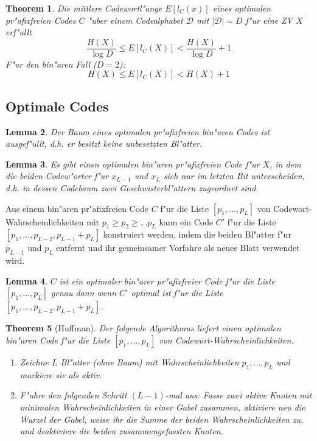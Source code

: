 \documentclass[german, 10pt, a4paper, twocolumn]{scrartcl}
\newtheorem{theorem}{Theorem}
\newtheorem{lemma}[theorem]{Lemma}
\begin{document}
\begin{theorem}
	Die mittlere Codewortl"ange $E[l_C(x)]$ eines optimalen pr"afixfreien Codes $C$ "uber einem Codealphabet $\mathcal{D}$ mit $|\mathcal{D}|=D$ f"ur eine ZV $X$ erf"ullt
	\begin{displaymath}
		\frac{H(X)}{\log D} \leq E[l_C(X)] < \frac{H(X)}{\log D} + 1
	\end{displaymath}
	F"ur den bin"aren Fall ($D=2$):
	\begin{displaymath}
		H(X) \leq E[l_C(X)] < H(X) + 1
	\end{displaymath}
	\label{mittlere_codewortlaenge}
\end{theorem}

\subsection{Optimale Codes}

\begin{lemma}
	Der Baum eines optimalen pr"afixfreien bin"aren Codes ist ausgef"ullt, d.h. er besitzt keine unbesetzten Bl"atter.
\end{lemma}

\begin{lemma}
	Es gibt einen optimalen bin"aren pr"afixfreien Code f"ur $X$, in dem die beiden Codew"orter f"ur $x_{L-1}$ und $x_L$ sich nur im letzten Bit unterscheiden, d.h. in dessen Codebaum zwei Geschwisterbl"attern zugeordnet sind.
\end{lemma}

Aus einem bin"aren pr"afixfreien Code $C$ f"ur die Liste $[p_1,\ldots,p_L]$ von Codewort-Wahrscheinlichkeiten mit $p_1\geq p_2 \geq \ldots p_L$ kann ein Code $C'$ f"ur die Liste $[p_1,\ldots,p_{L-2},p_{L-1}+p_L]$ konstruiert werden, indem die beiden Bl"atter f"ur $p_{L-1}$ und $p_L$ entfernt und ihr gemeinsamer Vorfahre als neues Blatt verwendet wird.

\begin{lemma}
	$C$ ist ein optimaler bin"arer pr"afixfreier Code f"ur die Liste $[p_1,\ldots,p_L]$ genau dann wenn $C'$ optimal ist f"ur die Liste $[p_1,\ldots,p_{L-2},p_{L-1}+p_L]$.
\end{lemma}

\begin{theorem}[Huffman]
	Der folgende Algorithmus liefert einen optimalen bin"aren Code f"ur die Liste $[p_1,\ldots,p_L]$ von Codewort-Wahrscheinlichkeiten.
	\begin{enumerate}
		\item Zeichne $L$ Bl"atter (ohne Baum) mit Wahrscheinlichkeiten $p_1,\ldots,p_L$ und markiere sie als aktiv.
		\item F"uhre den folgenden Schritt $(L-1)$-mal aus: Fasse zwei aktive Knoten mit minimalen Wahrscheinlichkeiten in einer Gabel zusammen, aktiviere neu die Wurzel der Gabel, weise ihr die Summe der beiden Wahrscheinlichkeiten zu, und deaktiviere die beiden zusammengefassten Knoten.
	\end{enumerate}
\end{theorem}
\end{document}
